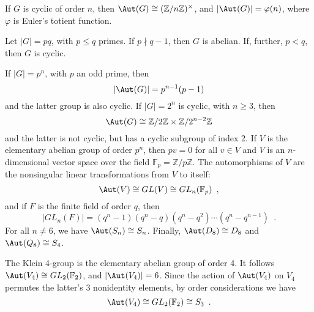 \begin{proposition}
	\cite[135]{DummitFoote2004}
	If $G$ is cyclic of order $n$, then $\Aut(G) \cong (\mathbb{Z} / n \mathbb{Z})^\times$,
	and $|\Aut(G)| = \varphi(n)$, where $\varphi$ is Euler's totient function.
\end{proposition}

\begin{corollary}
	\cite[136]{DummitFoote2004}
	Let $|G| = pq$, with $p \leq q$ primes. If $p \nmid q - 1$, then $G$ is abelian.
	If, further, $p < q$, then $G$ is cyclic.
\end{corollary}

\begin{proposition}
	\cite[136]{DummitFoote2004}
	If $|G| = p^n$, with $p$ an odd prime, then
	\begin{equation}
		|\Aut(G)| = p^{n - 1} (p - 1)
	\end{equation}
	and the latter group is also cyclic. If $|G| = 2^n$ is cyclic, with $n \geq 3$, then
	\begin{equation}
		\Aut(G) \cong \mathbb{Z} / 2 \mathbb{Z} \times \mathbb{Z} / 2^{n - 2} \mathbb{Z}
	\end{equation}
	and the latter is not cyclic, but has a cyclic subgroup of index 2. If $V$ is the
	elementary abelian group of order $p^n$, then $pv = 0$ for all $v \in V$ and $V$ is an
	$n$-dimensional vector space over the field $\mathbb{F}_p = \mathbb{Z} / p \mathbb{Z}$.
	The automorphisms of $V$ are the nonsingular linear transformations from $V$ to itself:
	\begin{equation}
		\Aut(V) \cong GL(V) \cong GL_n(\mathbb{F}_p) \enspace,
	\end{equation}
	and if $F$ is the finite field of order $q$, then
	\begin{equation}
		|GL_n(F)| = (q^n - 1) (q^n - q) (q^n - q^2) \cdots (q^n - q^{n - 1}) \enspace.
	\end{equation}
	For all $n \ne 6$, we have $\Aut(S_n) \cong S_n$. Finally, $\Aut(D_8) \cong D_8$ and
	$\Aut(Q_8) \cong S_4$.
\end{proposition}

\begin{example}
	\cite[137]{DummitFoote2004}
	The Klein 4-group is the elementary abelian group of order 4. It follows
	$\Aut(V_4) \cong GL_2(\mathbb{F}_2)$, and $|\Aut(V_4)| = 6$. Since the action of
	$\Aut(V_4)$ on $V_4$ permutes the latter's 3 nonidentity elements, by order
	considerations we have
	\begin{equation}
		\Aut(V_4) \cong GL_2(\mathbb{F}_2) \cong S_3 \enspace.
	\end{equation}
\end{example}

